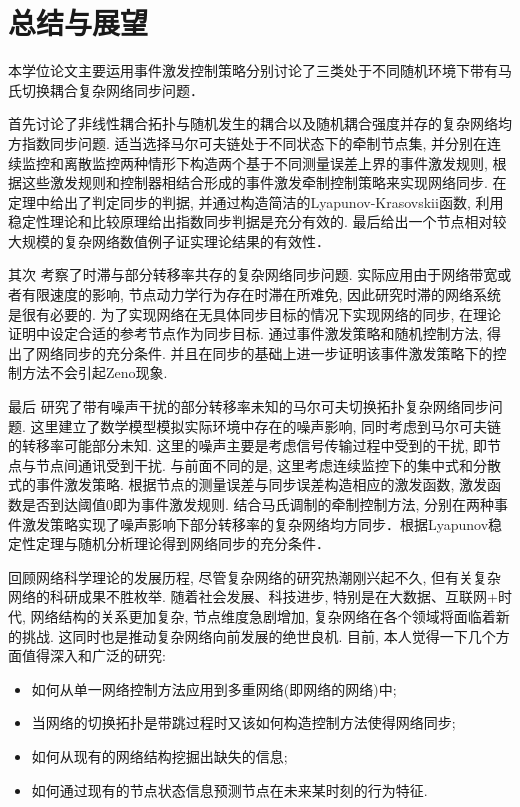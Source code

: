 \chapter{总结与展望}\label{chap:end}

本学位论文主要运用事件激发控制策略分别讨论了三类处于不同随机环境下带有马氏切换耦合复杂网络同步问题．

首先讨论了非线性耦合拓扑与随机发生的耦合以及随机耦合强度并存的复杂网络均方指数同步问题. 适当选择马尔可夫链处于不同状态下的牵制节点集, 并分别在连续监控和离散监控两种情形下构造两个基于不同测量误差上界的事件激发规则, 根据这些激发规则和控制器相结合形成的事件激发牵制控制策略来实现网络同步. 在定理中给出了判定同步的判据, 并通过构造简洁的Lyapunov-Krasovskii函数, 利用稳定性理论和比较原理给出指数同步判据是充分有效的. 最后给出一个节点相对较大规模的复杂网络数值例子证实理论结果的有效性．

其次 考察了时滞与部分转移率共存的复杂网络同步问题. 实际应用由于网络带宽或者有限速度的影响, 节点动力学行为存在时滞在所难免, 因此研究时滞的网络系统是很有必要的. 为了实现网络在无具体同步目标的情况下实现网络的同步, 在理论证明中设定合适的参考节点作为同步目标. 通过事件激发策略和随机控制方法, 得出了网络同步的充分条件. 并且在同步的基础上进一步证明该事件激发策略下的控制方法不会引起Zeno现象.

最后 研究了带有噪声干扰的部分转移率未知的马尔可夫切换拓扑复杂网络同步问题. 这里建立了数学模型模拟实际环境中存在的噪声影响, 同时考虑到马尔可夫链的转移率可能部分未知. 这里的噪声主要是考虑信号传输过程中受到的干扰, 即节点与节点间通讯受到干扰. 与前面不同的是, 这里考虑连续监控下的集中式和分散式的事件激发策略. 根据节点的测量误差与同步误差构造相应的激发函数, 激发函数是否到达阈值$0$即为事件激发规则. 结合马氏调制的牵制控制方法, 分别在两种事件激发策略实现了噪声影响下部分转移率的复杂网络均方同步．根据Lyapunov稳定性定理与随机分析理论得到网络同步的充分条件．

回顾网络科学理论的发展历程, 尽管复杂网络的研究热潮刚兴起不久, 但有关复杂网络的科研成果不胜枚举. 随着社会发展、科技进步, 特别是在大数据、互联网+时代, 网络结构的关系更加复杂, 节点维度急剧增加, 复杂网络在各个领域将面临着新的挑战. 这同时也是推动复杂网络向前发展的绝世良机. 目前, 本人觉得一下几个方面值得深入和广泛的研究:
\begin{itemize}\setlength{\itemsep}{0cm}
  \item 如何从单一网络控制方法应用到多重网络(即网络的网络)中;
  \item 当网络的切换拓扑是带跳过程时又该如何构造控制方法使得网络同步;
  \item 如何从现有的网络结构挖掘出缺失的信息;
  \item 如何通过现有的节点状态信息预测节点在未来某时刻的行为特征.
\end{itemize}



